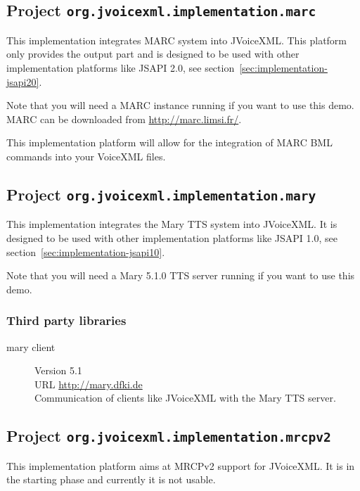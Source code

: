 \documentclass[11pt,a4paper]{article}
\begin{document}
\subsection{Project \texttt{org.jvoicexml.implementation.marc}}

This implementation integrates MARC system into JVoiceXML. This platform
only provides the output part and is designed to be used with other
implementation platforms like JSAPI 2.0, see
section~\ref{sec:implementation-jsapi20}.

Note that you will need a MARC instance running if you want to use this
demo. MARC can be downloaded from \url{http://marc.limsi.fr/}.

This implementation platform will allow for the integration of MARC BML commands
into your VoiceXML files.

\subsection{Project \texttt{org.jvoicexml.implementation.mary}}

This implementation integrates the Mary TTS system into JVoiceXML. It is
designed to be used with other implementation platforms like JSAPI 1.0, see
section~\ref{sec:implementation-jsapi10}.

Note that you will need a Mary 5.1.0  TTS server running if you want to use this
demo. 

\subsubsection{Third party libraries}
\label{sec:mary-third-party-libr}

\begin{description}
\item[mary client] Version 5.1 \\
URL \url{http://mary.dfki.de} \\
Communication of clients like JVoiceXML with the Mary TTS server.
\end{description}

\subsection{Project \texttt{org.jvoicexml.implementation.mrcpv2}}

This implementation platform aims at MRCPv2 support for JVoiceXML. It is in the
starting phase and currently it is not usable.
\end{document}
